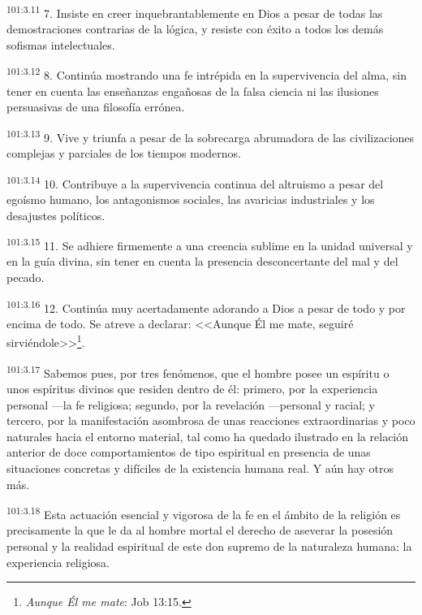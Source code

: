 \par
\textsuperscript{101:3.11} 7. Insiste en creer inquebrantablemente en Dios a pesar de todas las demostraciones contrarias de la lógica, y resiste con éxito a todos los demás sofismas intelectuales.

\par
\textsuperscript{101:3.12} 8. Continúa mostrando una fe intrépida en la supervivencia del alma, sin tener en cuenta las enseñanzas engañosas de la falsa ciencia ni las ilusiones persuasivas de una filosofía errónea.

\par
\textsuperscript{101:3.13} 9. Vive y triunfa a pesar de la sobrecarga abrumadora de las civilizaciones complejas y parciales de los tiempos modernos.

\par
\textsuperscript{101:3.14} 10. Contribuye a la supervivencia continua del altruismo a pesar del egoísmo humano, los antagonismos sociales, las avaricias industriales y los desajustes políticos.

\par
\textsuperscript{101:3.15} 11. Se adhiere firmemente a una creencia sublime en la unidad universal y en la guía divina, sin tener en cuenta la presencia desconcertante del mal y del pecado.

\par
\textsuperscript{101:3.16} 12. Continúa muy acertadamente adorando a Dios a pesar de todo y por encima de todo. Se atreve a declarar: <<Aunque Él me mate, seguiré sirviéndole>>\footnote{\textit{Aunque Él me mate}: Job 13:15.}.

\par
\textsuperscript{101:3.17} Sabemos pues, por tres fenómenos, que el hombre posee un espíritu o unos espíritus divinos que residen dentro de él: primero, por la experiencia personal ---la fe religiosa; segundo, por la revelación ---personal y racial; y tercero, por la manifestación asombrosa de unas reacciones extraordinarias y poco naturales hacia el entorno material, tal como ha quedado ilustrado en la relación anterior de doce comportamientos de tipo espiritual en presencia de unas situaciones concretas y difíciles de la existencia humana real. Y aún hay otros más.

\par
\textsuperscript{101:3.18} Esta actuación esencial y vigorosa de la fe en el ámbito de la religión es precisamente la que le da al hombre mortal el derecho de aseverar la posesión personal y la realidad espiritual de este don supremo de la naturaleza humana: la experiencia religiosa.

